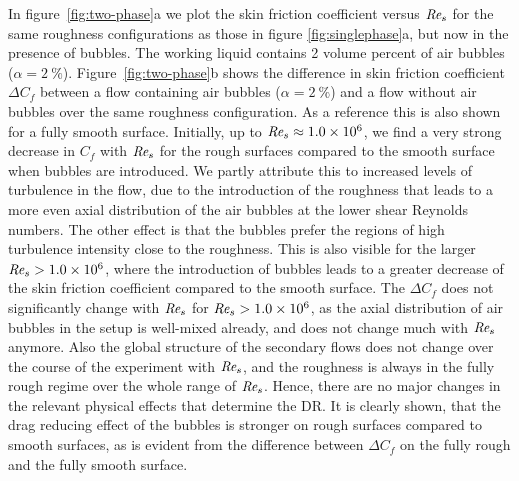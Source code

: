 \documentclass[aps,twocolumn,10pt,floatfix, superscriptaddress,longbibliography,pra]{revtex4-1}
\newcommand\Rey{\mbox{\textit{Re$_s$}}}  %
\newcommand{\perc}[1]{ \SI{#1}{\percent} }
\newcommand{\e}[1]{\times 10^{#1}}
\begin{document}
 In figure~\ref{fig:two-phase}a we plot the skin friction coefficient versus $\Rey$ for the same roughness configurations as those in figure \ref{fig:singlephase}a, but now in the presence of bubbles. The working liquid contains 2 volume percent of air bubbles ($\alpha = \perc{2}$). Figure~\ref{fig:two-phase}b shows the difference in skin friction coefficient $\Delta C_f$ between a flow containing air bubbles ($\alpha=\perc{2}$) and a flow without air bubbles over the same roughness configuration. As a reference this is also shown for a fully smooth surface. Initially, up to $\Rey \approx 1.0\e{6}$, we find a very strong decrease in $C_f$ with $\Rey$ for the rough surfaces compared to the smooth surface when bubbles are introduced. We partly attribute this to increased levels of turbulence in the flow, due to the introduction of the roughness that leads to a more even axial distribution of the air bubbles at the lower shear Reynolds numbers. The other effect is that the bubbles prefer the regions of high turbulence intensity close to the roughness. This is also visible for the larger $\Rey > 1.0\e{6}$, where the introduction of bubbles leads to a greater decrease of the skin friction coefficient compared to the smooth surface. The $\Delta C_f$ does not significantly change with $\Rey$ for $\Rey > 1.0\e{6}$, as the axial distribution of air bubbles in the setup is well-mixed already, and does not change much with $\Rey$ anymore. Also the global structure of the secondary flows does not change over the course of the experiment with $\Rey$, and the roughness is always in the fully rough regime over the whole range of $\Rey$. Hence, there are no major changes in the relevant physical effects that determine the DR. It is clearly shown, that the drag reducing effect of the bubbles is stronger on rough surfaces compared to smooth surfaces, as is evident from the difference between $\Delta C_f$ on the fully rough and the fully smooth surface.
\end{document}
